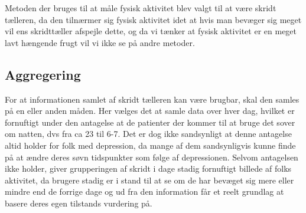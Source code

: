 Metoden der bruges til at måle fysisk aktivitet blev valgt til at være skridt tælleren, da den tilnærmer sig fysisk aktivitet idet at hvis man bevæger sig meget vil ens skridttæller afspejle dette, og da vi tænker at fysisk aktivitet er en meget lavt hængende frugt vil vi ikke se på andre metoder.

\subsection{Aggregering}
For at informationen samlet af skridt tælleren kan være brugbar, skal den samles på en eller anden måden.
Her vælges det at samle data over hver dag, hvilket er fornuftigt under den antagelse at de patienter der kommer til at bruge det sover om natten, dvs fra ca 23 til 6-7.
Det er dog ikke sandsynligt at denne antagelse altid holder for folk med depression, da mange af dem sandsynligvis kunne finde på at ændre deres søvn tidspunkter som følge af depressionen.
Selvom antagelsen ikke holder, giver grupperingen af skridt i dage stadig fornuftigt billede af folks aktivitet, da brugere stadig er i stand til at se om de har bevæget sig mere eller mindre end de forrige dage og ud fra den information får et reelt grundlag at basere deres egen tilstands vurdering på.